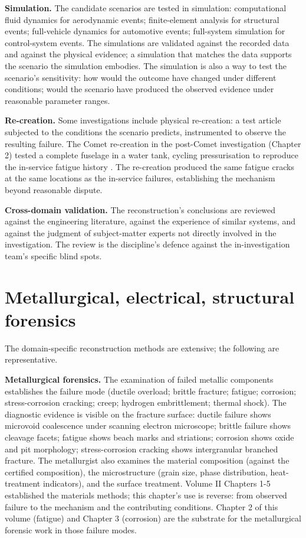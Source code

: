 \textbf{Simulation.} The candidate scenarios are tested in simulation: computational fluid dynamics for aerodynamic events; finite-element analysis for structural events; full-vehicle dynamics for automotive events; full-system simulation for control-system events. The simulations are validated against the recorded data and against the physical evidence; a simulation that matches the data supports the scenario the simulation embodies. The simulation is also a way to test the scenario's sensitivity: how would the outcome have changed under different conditions; would the scenario have produced the observed evidence under reasonable parameter ranges.

\textbf{Re-creation.} Some investigations include physical re-creation: a test article subjected to the conditions the scenario predicts, instrumented to observe the resulting failure. The Comet re-creation in the post-Comet investigation (Chapter 2) tested a complete fuselage in a water tank, cycling pressurisation to reproduce the in-service fatigue history \cite{acc:cohen-comet-report-1955,text:withey-fatigue-comet}. The re-creation produced the same fatigue cracks at the same locations as the in-service failures, establishing the mechanism beyond reasonable dispute.

\textbf{Cross-domain validation.} The reconstruction's conclusions are reviewed against the engineering literature, against the experience of similar systems, and against the judgment of subject-matter experts not directly involved in the investigation. The review is the discipline's defence against the in-investigation team's specific blind spots.

\section{Metallurgical, electrical, structural forensics}

The domain-specific reconstruction methods are extensive; the following are representative.

\textbf{Metallurgical forensics.} The examination of failed metallic components establishes the failure mode (ductile overload; brittle fracture; fatigue; corrosion; stress-corrosion cracking; creep; hydrogen embrittlement; thermal shock). The diagnostic evidence is visible on the fracture surface: ductile failure shows microvoid coalescence under scanning electron microscope; brittle failure shows cleavage facets; fatigue shows beach marks and striations; corrosion shows oxide and pit morphology; stress-corrosion cracking shows intergranular branched fracture. The metallurgist also examines the material composition (against the certified composition), the microstructure (grain size, phase distribution, heat-treatment indicators), and the surface treatment. Volume II Chapters 1-5 established the materials methods; this chapter's use is reverse: from observed failure to the mechanism and the contributing conditions. Chapter 2 of this volume (fatigue) and Chapter 3 (corrosion) are the substrate for the metallurgical forensic work in those failure modes.

